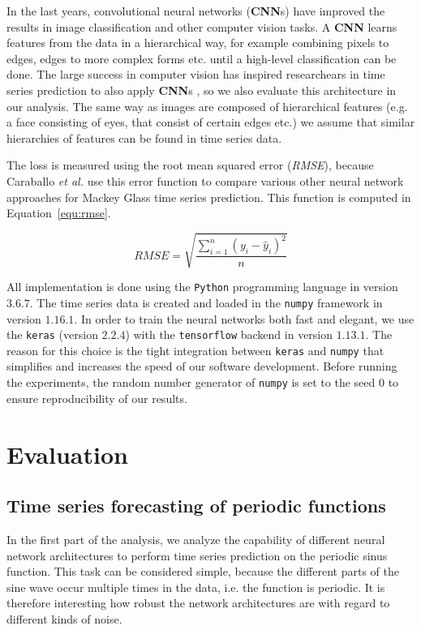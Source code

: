 \documentclass{article}
\begin{document}
In the last years, convolutional neural networks (\textbf{CNN}s) have improved
the results in image classification \cite{krizhevsky2012} and other computer
vision tasks. A \textbf{CNN} learns features from the data in a hierarchical
way, for example combining pixels to edges, edges to more complex forms etc.
until a high-level classification can be done. The large success in computer
vision has inspired researchears in time series prediction to also apply
\textbf{CNN}s \cite{cui2016, borovykh2017}, so we also evaluate this
architecture in our analysis. The same way as images are composed of
hierarchical features (e.g. a face consisting of eyes, that consist of
certain edges etc.) we assume that similar hierarchies of features can be found
in time series data.

The loss is measured using the root mean squared error (\emph{RMSE}), because
Caraballo \textit{et al.} \cite{caraballo2016} use this error function to 
compare various other neural network approaches for Mackey Glass time series
prediction. This function is computed in Equation~\ref{equ:rmse}.

\begin{equation}
  RMSE = \sqrt{\frac{\sum_{i=1}^n (y_i - \hat{y}_i)^2}{n}}
  \label{equ:rmse}
\end{equation}

All implementation is done using the \texttt{Python} programming language in
version $3.6.7$. The time series data is created and loaded in the
\texttt{numpy} framework in version $1.16.1$. In order to train the neural
networks both fast and elegant, we use the \texttt{keras} (version $2.2.4$)
with the
\texttt{tensorflow} backend in version $1.13.1$.
The reason for this choice is the tight
integration between \texttt{keras} and \texttt{numpy} that simplifies and
increases the speed of our software development. Before running the experiments,
the random number generator of \texttt{numpy} is set to the seed $0$ to ensure
reproducibility of our results.

\section{Evaluation}
\subsection{Time series forecasting of periodic functions}
\label{sec:sine}
In the first part of the analysis, we analyze the capability of different neural
network architectures to perform time series prediction on the periodic sinus
function. This task can be considered simple, because the different parts of the
sine wave occur multiple times in the data, i.e. the function is periodic.
It is therefore interesting how
robust the network architectures are with regard to different kinds of noise.
\end{document}
